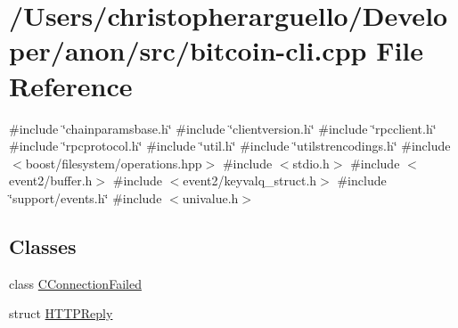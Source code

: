 \hypertarget{bitcoin-cli_8cpp}{}\section{/\+Users/christopherarguello/\+Developer/anon/src/bitcoin-\/cli.cpp File Reference}
\label{bitcoin-cli_8cpp}
{\ttfamily \#include \char`\"{}chainparamsbase.\+h\char`\"{}}\newline
{\ttfamily \#include \char`\"{}clientversion.\+h\char`\"{}}\newline
{\ttfamily \#include \char`\"{}rpcclient.\+h\char`\"{}}\newline
{\ttfamily \#include \char`\"{}rpcprotocol.\+h\char`\"{}}\newline
{\ttfamily \#include \char`\"{}util.\+h\char`\"{}}\newline
{\ttfamily \#include \char`\"{}utilstrencodings.\+h\char`\"{}}\newline
{\ttfamily \#include $<$boost/filesystem/operations.\+hpp$>$}\newline
{\ttfamily \#include $<$stdio.\+h$>$}\newline
{\ttfamily \#include $<$event2/buffer.\+h$>$}\newline
{\ttfamily \#include $<$event2/keyvalq\+\_\+struct.\+h$>$}\newline
{\ttfamily \#include \char`\"{}support/events.\+h\char`\"{}}\newline
{\ttfamily \#include $<$univalue.\+h$>$}\newline
\subsection*{Classes}
\begin{DoxyCompactItemize}
\item 
class \mbox{\hyperlink{class_c_connection_failed}{C\+Connection\+Failed}}
\item 
struct \mbox{\hyperlink{struct_h_t_t_p_reply}{H\+T\+T\+P\+Reply}}
\end{DoxyCompactItemize}
